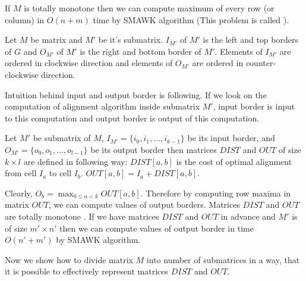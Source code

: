 If $M$ is totally monotone then we can compute maximum of every row (or column)
in $O(n+m)$ time by SMAWK algorithm \cite{Aggarwal1987} (This problem is called
).

\begin{definition}\cite{Crochemore2002}
Let $M$ be matrix and $M'$ be it's
submatrix.  $I_{M'}$ of $M'$ is the left and top
borders of $G$ and  $O_{M'}$ of $M'$ is the right and
bottom border of $M'$. Elements of $I_{M'}$ are ordered in clockwise direction
and elements of $O_{M'}$ are ordered in counter-clockwise direction.
\end{definition}

Intuition behind input and output border is following. If we look on the
computation of alignment algorithm inside submatrix $M'$, input border is input
to this computation and output border is output of this computation.

\begin{definition}\cite{Crochemore2002}
Let $M'$ be submatrix of $M$, $I_{M'}=\{i_0,i_1,\dots,i_{k-1}\}$ be its input
border, and $O_{M'}=\{o_0,o_1,\dots,o_{l-1}\}$ be its output border then
matrices
$DIST$ and $OUT$ of size $k\times l$ are defined in following way:
$DIST[a,b]$ is the cost of optimal alignment from cell $I_a$ to cell $I_b$.
$OUT[a,b]=I_a+DIST[a,b]$.
\end{definition}

Clearly, $O_b=\max_{0\leq a < k}OUT[a,b]$. Therefore by computing row maxima in
matrix $OUT$, we can compute values of output borders. Matrices $DIST$ and $OUT$
are totally monotone \cite{Crochemore2002}.  If we have matrices $DIST$ and
$OUT$ in advance and $M'$ is of size $m'\times n'$ then we can compute values of
output border in time $O(n'+m')$ by SMAWK algorithm.

Now we show how to divide matrix $M$ into number of submatrices in a way, that
it is possible to effectively represent matrices $DIST$ and $OUT$.


